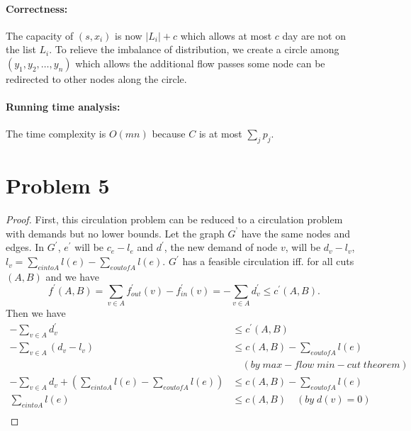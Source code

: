 \documentclass[paper=a4, fontsize=12pt]{scrartcl} %
\numberwithin{equation}{section} %
\numberwithin{figure}{section} %
\numberwithin{table}{section} %
\begin{document}
\paragraph{Correctness:} The capacity of $(s, x_i)$ is now $|L_i| + c$ which allows at most $c$ day are not on the list $L_i$. To relieve the imbalance of distribution, we create a circle among $(y_1, y_2, \dots, y_n)$ which allows the additional flow passes some node can be redirected to other nodes along the circle.
\paragraph{Running time analysis:} The time complexity is $O(mn)$ because $C$ is at most $\sum_j{p_j}$.

\section*{Problem 5} 
\begin{proof} 
First, this circulation problem can be reduced to a circulation problem with demands but no lower bounds. Let the graph $G^{’}$ have the same nodes and edges. In $G^{'}$, $e^{'}$ will be $c_e - l_e$ and $d^{'}$, the new demand of node $v$, will be $d_v - l_v$, $l_v = \sum_{e into A}l(e) - \sum_{e out of A}l(e)$. $G^{'}$ has a feasible circulation iff. for all cuts $(A,B)$ and we have\[
 f^{'}(A,B) = \sum_{v \in A}{f^{'}_{out}(v) - f^{'}_{in}(v)} = - \sum_{v \in A}d^{'}_v \leq c^{'}(A,B).
\]
Then we have
\begin{equation*}
\begin{split}
	- \sum_{v \in A}d^{'}_v & \leq c^{'}(A,B)   \\
	- \sum_{v \in A}(d_v - l_v) & \leq c(A,B) - \sum_{e out of A}l(e) \\ 
	& \quad (by \; max-flow \;  min-cut \; theorem) \\
	- \sum_{v \in A}d_v + (\sum_{e into A}l(e) - \sum_{e out of A}l(e)) & \leq c(A,B) - \sum_{e out of A}l(e) \\ 
	\sum_{e into A}l(e) & \leq c(A,B)  \quad(by \; d(v) = 0) \\
\end{split}
\end{equation*}
\end{proof}
\end{document}
